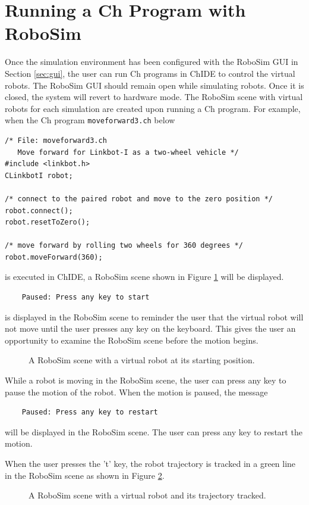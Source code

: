 \documentclass{article}
\begin{document}
\section{Running a Ch Program with RoboSim}
Once the simulation environment has been configured with the RoboSim GUI in
Section \ref{sec:gui}, the user can run Ch programs in ChIDE to control the
virtual robots.  The RoboSim GUI should remain open while simulating robots.
Once it is closed, the system will revert to hardware mode.  The RoboSim scene
with virtual robots for each simulation are created upon running a Ch program.
For example, when the Ch program {\tt moveforward3.ch} below
\begin{verbatim}
/* File: moveforward3.ch
   Move forward for Linkbot-I as a two-wheel vehicle */
#include <linkbot.h>
CLinkbotI robot;

/* connect to the paired robot and move to the zero position */
robot.connect();
robot.resetToZero();

/* move forward by rolling two wheels for 360 degrees */
robot.moveForward(360);
\end{verbatim}
\noindent
is executed in ChIDE, a RoboSim scene shown in Figure \ref{fig:robosim_scene}
will be displayed.
\begin{verbatim}
    Paused: Press any key to start
\end{verbatim}
is displayed in the RoboSim scene to reminder the user that the virtual robot
will not move until the user presses any key on the keyboard. This gives the
user an opportunity to examine the RoboSim scene before the motion begins.
\begin{figure}[H]
	\begin{center}
	\end{center}
	\caption{A RoboSim scene with a virtual robot at its starting position.}
	\label{fig:robosim_scene}
\end{figure}

While a robot is moving in the RoboSim scene, the user can press any key to
pause the motion of the robot.  When the motion is paused, the message
\begin{verbatim}
    Paused: Press any key to restart
\end{verbatim}
will be displayed in the RoboSim scene. The user can press any key to restart
the motion.

When the user presses the 't' key, the robot trajectory is tracked in a green
line in the RoboSim scene as shown in Figure \ref{fig:robosim_tracked}.
\begin{figure}[H]
	\begin{center}
	\end{center}
	\caption{A RoboSim scene with a virtual robot and its trajectory tracked.}
	\label{fig:robosim_tracked}
\end{figure}
\end{document}
